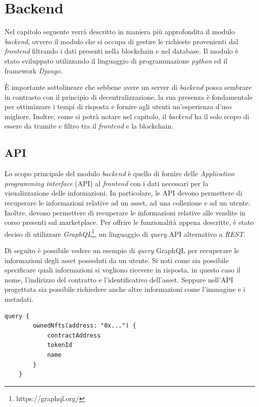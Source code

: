 \section{Backend}
\label{sec:backend}

Nel capitolo seguente verrà descritto in maniera più approfondita il modulo \textit{backend}, ovvero il modulo che si occupa di gestire le richieste provenienti dal \textit{frontend} filtrando i dati presenti nella blockchain e nel database. Il modulo è stato sviluppato utilizzando il linguaggio di programmazione \textit{python} ed il framework \textit{Django}. 

È importante sottolineare che sebbene avere un server di \textit{backend} possa sembrare in contrasto con il principio di decentralizzazione, la sua presenza è fondamentale per ottimizzare i tempi di risposta e fornire agli utenti un'esperienza d'uso migliore.  Inoltre, come si potrà notare nel capitolo, il \textit{backend} ha il solo scopo di essere da tramite e filtro tra il \textit{frontend} e la blockchain.

\subsection{API}

Lo scopo principale del modulo \textit{backend} è quello di fornire delle \textit{Application programming interface} (API) al \textit{frontend} con i dati necessari per la visualizzazione delle informazioni. In particolare, le API devono permettere di recuperare le informazioni relative ad un asset, ad una collezione e ad un utente. Inoltre, devono permettere di recuperare le informazioni relative alle vendite in corso presenti sul marketplace. Per offrire le funzionalità appena descritte, è stato deciso di utilizzare \textit{GraphQL}\footnote{https://graphql.org/}, un linguaggio di \textit{query} API alternativo a \textit{REST}.

Di seguito è possibile vedere un esempio di \textit{query} GraphQL per recuperare le informazioni degli asset posseduti da un utente. Si noti come sia possibile specificare quali informazioni si vogliono ricevere in risposta, in questo caso il nome, l'indirizzo del contratto e l'identificativo dell'asset. Seppure nell'API progettata sia possibile richiedere anche altre informazioni come l'immagine e i metadati.

\begin{lstlisting}[basicstyle=\small]
    query {
        ownedNfts(address: "0x...") {
            contractAddress
            tokenId
            name
        }
    }
\end{lstlisting}

